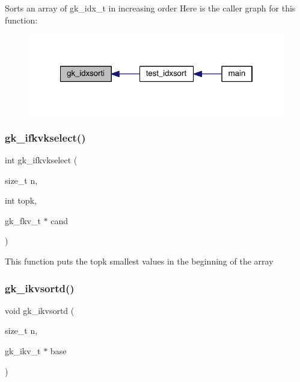 Sorts an array of gk\+\_\+idx\+\_\+t in increasing order Here is the caller graph for this function\+:\nopagebreak
\begin{figure}[H]
\begin{center}
\leavevmode
\includegraphics[width=322pt]{a00077_ad863e6e90eb4028e89bfb66e8d8a3c08_icgraph}
\end{center}
\end{figure}
\mbox{\label{a00077_adf2afc6aa313247a04ff5eb828d7e518}} 
\subsubsection{\texorpdfstring{gk\+\_\+ifkvkselect()}{gk\_ifkvkselect()}}
{\footnotesize\ttfamily int gk\+\_\+ifkvkselect (\begin{DoxyParamCaption}\item[{size\+\_\+t}]{n,  }\item[{int}]{topk,  }\item[{gk\+\_\+fkv\+\_\+t $\ast$}]{cand }\end{DoxyParamCaption})}

This function puts the \textquotesingle{}topk\textquotesingle{} smallest values in the beginning of the array \mbox{\label{a00077_a6630af89129be5c65ca81e3f3cfc3f9f}} 
\subsubsection{\texorpdfstring{gk\+\_\+ikvsortd()}{gk\_ikvsortd()}}
{\footnotesize\ttfamily void gk\+\_\+ikvsortd (\begin{DoxyParamCaption}\item[{size\+\_\+t}]{n,  }\item[{gk\+\_\+ikv\+\_\+t $\ast$}]{base }\end{DoxyParamCaption})}

